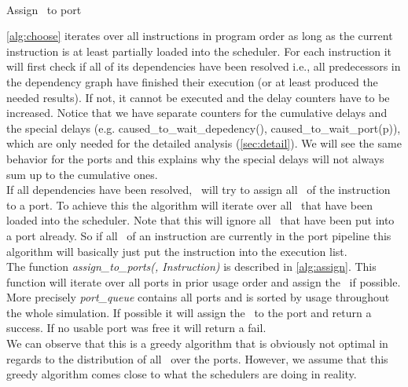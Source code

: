 ~\\[-1em]
\begin{algorithm}[H]
    \SetAlgoLined
    \caption{Assign \microop\ to port}
    \label{alg:assign}
\end{algorithm}
\vspace{5pt}

\autoref{alg:choose} iterates over all instructions in program order as long as the current instruction is at least partially loaded into the scheduler. For each instruction it will first check if all of its dependencies have been resolved i.e., all predecessors in the dependency graph have finished their execution (or at least produced the needed results). If not, it cannot be executed and the delay counters have to be increased. Notice that we have separate counters for the cumulative delays and the special delays (e.g. caused\_to\_wait\_depedency(), caused\_to\_wait\_port(p)), which are only needed for the detailed analysis (\autoref{sec:detail}). We will see the same behavior for the ports and this explains why the special delays will not always sum up to the cumulative ones.\\
If all dependencies have been resolved, \suaca\ will try to assign all \microops\ of the instruction to a port. To achieve this the algorithm will iterate over all \microops\ that have been loaded into the scheduler. Note that this will ignore all \microops\ that have been put into a port already. So if all \microops\ of an instruction are currently in the port pipeline this algorithm will basically just put the instruction into the execution list.\\ 
The function \emph{assign\_to\_ports(\microop, Instruction)} is described in \autoref{alg:assign}. This function will iterate over all ports in prior usage order and assign the \microop\ if possible. More precisely \emph{port\_queue} contains all ports and is sorted by usage throughout the whole simulation. If possible it will assign the \microop\ to the port and return a success. If no usable port was free it will return a fail.\\
We can observe that this is a greedy algorithm that is obviously not optimal in regards to the distribution of all \microops\ over the ports. However, we assume that this greedy algorithm comes close to what the schedulers are doing in reality.\\
